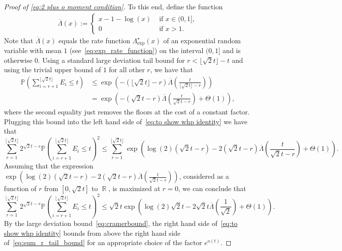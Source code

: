 \documentclass[11pt]{article}
\numberwithin{equation}{section}
\DeclareMathOperator{\R}{\mathbb{R}} %
\theoremstyle{definition}
\begin{document}
\begin{proof}[Proof of \eqref{eq:2 plus o moment condition}]
To this end, define the function 
    \begin{align*}
        \overline{\Lambda}(x) := \begin{cases}
        x-1-\log(x) &\text{ if } x \in (0,1],\\
        0 &\text{ if } x>1.
        \end{cases}
    \end{align*}
Note that $\overline{\Lambda}(x)$ equals the rate function $\Lambda^{\star}_{\exp}(x)$ of an exponential random variable with mean $1$ 
(see~\eqref{eq:exp_rate_function}) 
on the interval $(0,1]$ and is otherwise $0$. 
Using a standard large deviation tail bound for $r < \lfloor \sqrt{2}t \rfloor - t$ and using the trivial upper bound of $1$ for all other $r$, we have that 
\begin{align*}
\mathbb{P} \left( \sum_{i=r+1}^{\lfloor \sqrt{2}t \rfloor} E_i \leq t \right) 
&\leq \exp \left( - \left( \lfloor \sqrt{2}t \rfloor - r \right) \overline{\Lambda} \left( \frac{t}{\lfloor \sqrt{2}t \rfloor - r} \right) \right) \\
&= \exp \left( - \left( \sqrt{2}t - r \right) \overline{\Lambda} \left( \frac{t}{\sqrt{2}t - r} \right)  + \Theta(1) \right),
\end{align*}
where the second equality just removes the floors at the cost of a constant factor. 
Plugging this bound into the left hand side of~\eqref{eq:to show whp identity} we have that 
\begin{equation*}
\sum_{r=1}^{\lfloor \sqrt{2}t \rfloor}
    2^{\sqrt{2}t-r}
    \mathbb{P} \left( \sum_{i=r+1}^{\lfloor \sqrt{2}t \rfloor} E_i \leq t \right)^{2}
    \leq
    \sum_{r=1}^{\lfloor \sqrt{2}t \rfloor}
    \exp \left( \log(2) (\sqrt{2}t-r) - 2 (\sqrt{2}t-r) \overline{\Lambda}\left( \frac{t}{\sqrt{2}t - r} \right) + \Theta(1) \right).
    \end{equation*}
Assuming that the expression  
$\exp \left( \log(2) (\sqrt{2}t-r) - 2 (\sqrt{2}t-r) \overline{\Lambda}\left( \frac{t}{\sqrt{2}t - r} \right) \right)$, considered as a function of $r$ from $\left[0, \sqrt{2}t\right ]$ to $\R$,
is maximized at $r=0$, we can conclude that 
\begin{equation}\label{eq:sum_r_tail_bound}
        \sum_{r=1}^{\lfloor \sqrt{2}t \rfloor}
    2^{\sqrt{2}t-r}
    \mathbb{P} \left( \sum_{i=r+1}^{\lfloor \sqrt{2}t \rfloor} E_i \leq t \right)^{2}
    \leq \sqrt{2}t \exp \left( \log(2) \sqrt{2}t - 2 \sqrt{2}t \overline{\Lambda}\left( \frac{1}{\sqrt{2}} \right) + \Theta(1) \right).
    \end{equation}
By the large deviation bound~\eqref{eq:cramerbound}, the right hand side of~\eqref{eq:to show whp identity} bounds from above the right hand side of~\eqref{eq:sum_r_tail_bound} for an appropriate choice of the factor $e^{o(t)}$. 
    

\end{proof}
\end{document}
